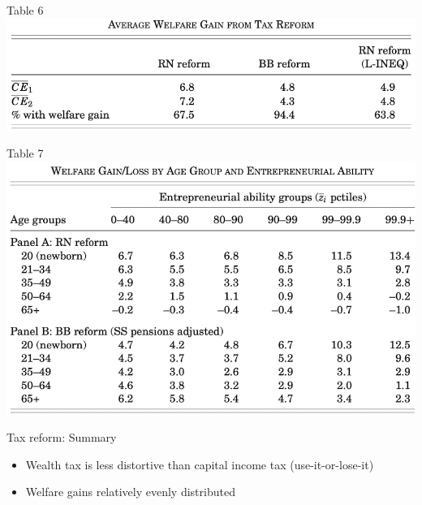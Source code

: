 \documentclass[aspectratio=169,mathserif]{beamer}
\begin{document}
\begin{frame}{Table 6}
    \centering
    \includegraphics[scale = 0.4]{GKKOC_Tab6.png}
\end{frame}


\begin{frame}{Table 7}
    \centering
    \includegraphics[scale = 0.4]{GKKOC_Tab7.png}
\end{frame}

\begin{frame}{Tax reform: Summary}
    \begin{itemize}
        \item Wealth tax is less distortive than capital income tax (use-it-or-lose-it)
        \item Welfare gains relatively evenly distributed%
    \end{itemize}
\end{frame}




\end{document}
